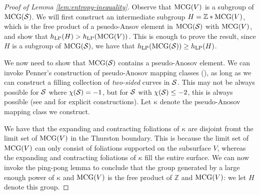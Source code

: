 \begin{proof}[Proof of Lemma \ref{lem:entropy-inequality}]
  Observe that $\mathrm{MCG}(V)$ is a subgroup of $\mathrm{MCG}(\mathcal{S})$.
  We will first construct an intermediate subgroup $H = \mathbb{Z} * \mathrm{MCG}(V)$, which is the free product of a psuedo-Ansov element in $\mathrm{MCG}(\mathcal{S})$ with $\mathrm{MCG}(V)$, and show that $h_{\mathrm{LP}}(H) > h_{\mathrm{LP}}(\mathrm{MCG}(V))$.
  This is enough to prove the result, since $H$ is a subgroup of $\mathrm{MCG}(\mathcal{S})$, we have that $h_{\mathrm{LP}}(\mathrm{MCG}(\mathcal{S})) \geq h_{\mathrm{LP}}(H)$.

  We now need to show that $\mathrm{MCG}(\mathcal{S})$ contains a pseudo-Anosov element.
  We can invoke Penner's construction of pseudo-Anosov mapping classes (\cite[Theorem 4.1]{penner1988construction}), as long as we can construct a filling collection of \emph{two-sided} curves in $\mathcal{S}$.
  This may not be always possible for $\mathcal{S}$ where $\chi(\mathcal{S}) = -1$, but for $\mathcal{S}$ with $\chi(\mathcal{S}) \leq -2$, this is always possible (see \cite{Liechti2018MinimalPS} and \cite{khan2023pseudo} for explicit constructions).
  Let $\kappa$ denote the pseudo-Anosov mapping class we construct.

  We have that the expanding and contracting foliations of $\kappa$ are disjoint fromt the limit set of $\mathrm{MCG}(V)$ in the Thurston boundary.
  This is because the limit set of $\mathrm{MCG}(V)$ can only consist of foliations supported on the subsurface $V$, whereas the expanding and contracting foliations of $\kappa$ fill the entire surface.
  We can now invoke the ping-pong lemma to conclude that the group generated by a large enough power of $\kappa$ and $\mathrm{MCG}(V)$ is the free product of $\mathbb{Z}$ and $\mathrm{MCG}(V)$: we let $H$ denote this group.


\end{proof}

